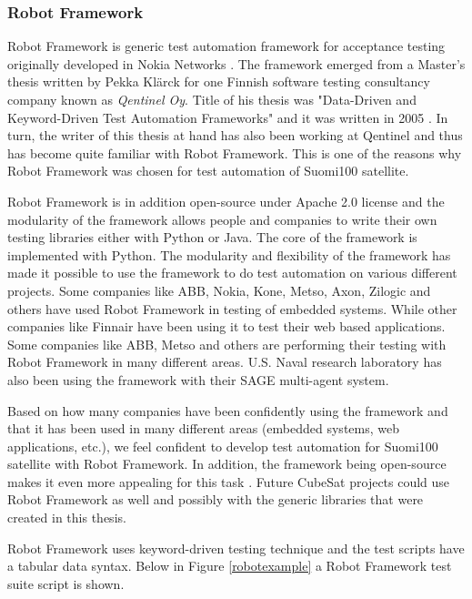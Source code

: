 \documentclass[english,12pt,a4paper,pdftex,elec,utf8]{aaltothesis}
\begin{document}
\subsubsection{Robot Framework}
Robot Framework is generic test automation framework for acceptance testing originally developed in Nokia Networks \cite{robotmain}. The framework emerged from a Master's thesis written by Pekka Klärck for one Finnish software testing consultancy company known as \textit{Qentinel Oy}. Title of his thesis was "Data-Driven and Keyword-Driven Test Automation Frameworks" and it was written in 2005 \cite{robotmain, klerkdippa}. In turn, the writer of this thesis at hand has also been working at Qentinel and thus has become quite familiar with Robot Framework. This is one of the reasons why Robot Framework was chosen for test automation of Suomi100 satellite. \par 
Robot Framework is in addition open-source under Apache 2.0 license and the modularity of the framework allows people and companies to write their own testing libraries either with Python or Java. The core of the framework is implemented with Python.
The modularity and flexibility of the framework has made it possible to use the framework to do test automation on various different projects. Some companies like ABB, Nokia, Kone, Metso, Axon, Zilogic and others have used Robot Framework in testing of embedded systems. While other companies like Finnair have been using it to test their web based applications. Some companies like ABB, Metso and others are performing their testing with Robot Framework in many different areas. U.S. Naval research laboratory has also been using the framework with their SAGE multi-agent system. \cite{robotmain}\par 
Based on how many companies have been confidently using the framework \cite{robotmain} and that it has been used in many different areas (embedded systems, web applications, etc.), we feel confident to develop test automation for Suomi100 satellite with Robot Framework. In addition, the framework being open-source makes it even more appealing for this task \cite{robotmain}. Future CubeSat projects could use Robot Framework as well and possibly with the generic libraries that were created in this thesis.\par
Robot Framework uses keyword-driven testing technique and the test scripts have a tabular data syntax. Below in Figure \ref{robotexample} a Robot Framework test suite script is shown.\par 
\end{document}
